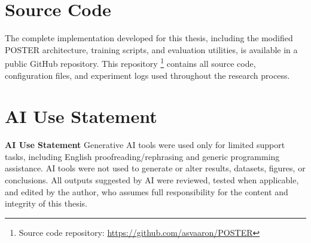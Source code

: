 \section{Source Code}
\label{deliverable:source-code}


The complete implementation developed for this thesis, including the modified POSTER architecture, training scripts, and evaluation utilities, is available in a public GitHub repository. This repository \footnote{Source code repository: \url{https://github.com/asvaaron/POSTER}} contains all source code, configuration files, and experiment logs used throughout the research process.

%
%


\clearpage
\section*{AI Use Statement}

\textbf{AI Use Statement}
Generative AI tools were used only for limited support tasks, including English proofreading/rephrasing and generic programming assistance. AI tools were not used to generate or alter results, datasets, figures, or conclusions. All outputs suggested by AI were reviewed, tested when applicable, and edited by the author, who assumes full responsibility for the content and integrity of this thesis.
